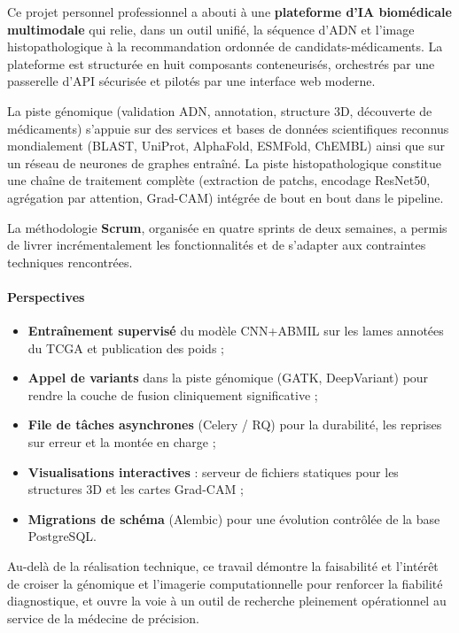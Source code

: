 \documentclass[12pt,a4paper,oneside]{book}
\begin{document}
Ce projet personnel professionnel a abouti à une \textbf{plateforme d'IA
biomédicale multimodale} qui relie, dans un outil unifié, la séquence d'ADN
et l'image histopathologique à la recommandation ordonnée de
candidats-médicaments. La plateforme est structurée en huit composants
conteneurisés, orchestrés par une passerelle d'API sécurisée et pilotés par
une interface web moderne.

La piste génomique (validation ADN, annotation, structure 3D, découverte
de médicaments) s'appuie sur des services et bases de données scientifiques
reconnus mondialement (BLAST, UniProt, AlphaFold, ESMFold, ChEMBL) ainsi
que sur un réseau de neurones de graphes entraîné. La piste
histopathologique constitue une chaîne de traitement complète
(extraction de patchs, encodage ResNet50, agrégation par attention,
Grad-CAM) intégrée de bout en bout dans le pipeline.

La méthodologie \textbf{Scrum}, organisée en quatre sprints de deux
semaines, a permis de livrer incrémentalement les fonctionnalités et de
s'adapter aux contraintes techniques rencontrées.

\paragraph{Perspectives}

\begin{itemize}
  \item \textbf{Entraînement supervisé} du modèle CNN+ABMIL sur les lames
    annotées du TCGA et publication des poids ;
  \item \textbf{Appel de variants} dans la piste génomique (GATK,
    DeepVariant) pour rendre la couche de fusion cliniquement
    significative ;
  \item \textbf{File de tâches asynchrones} (Celery / RQ) pour la
    durabilité, les reprises sur erreur et la montée en charge ;
  \item \textbf{Visualisations interactives} : serveur de fichiers
    statiques pour les structures 3D et les cartes Grad-CAM ;
  \item \textbf{Migrations de schéma} (Alembic) pour une évolution
    contrôlée de la base PostgreSQL.
\end{itemize}

Au-delà de la réalisation technique, ce travail démontre la faisabilité et
l'intérêt de croiser la génomique et l'imagerie computationnelle pour
renforcer la fiabilité diagnostique, et ouvre la voie à un outil de
recherche pleinement opérationnel au service de la médecine de précision.

\backmatter


\end{document}
